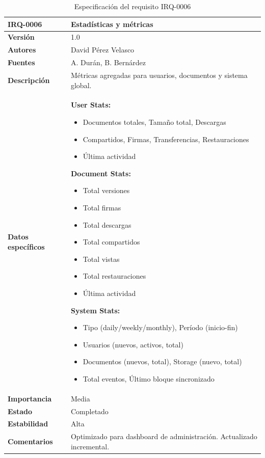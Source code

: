 \documentclass[11pt, a4paper]{article}
\begin{document}
\begin{table}[H]
    \centering
    \small
    \begin{tabular}{|p{4cm}|p{10cm}|}
    \hline
    \textbf{IRQ-0006} & Estadísticas y métricas \\
    \hline
    \textbf{Versión} & 1.0 \\
    \hline
    \textbf{Autores} & David Pérez Velasco \\
    \hline
    \textbf{Fuentes} & A. Durán, B. Bernárdez \\
    \hline
    \textbf{Descripción} & Métricas agregadas para usuarios, documentos y sistema global. \\
    \hline
    \textbf{Datos específicos} & 
    \textbf{User Stats:}
    \begin{itemize}
        \item Documentos totales, Tamaño total, Descargas
        \item Compartidos, Firmas, Transferencias, Restauraciones
        \item Última actividad
    \end{itemize}
    
    \textbf{Document Stats:}
    \begin{itemize}
        \item Total versiones
        \item Total firmas
        \item Total descargas
        \item Total compartidos
        \item Total vistas
        \item Total restauraciones
        \item Última actividad
    \end{itemize}
    
    \textbf{System Stats:}
    \begin{itemize}
        \item Tipo (daily/weekly/monthly), Período (inicio-fin)
        \item Usuarios (nuevos, activos, total)
        \item Documentos (nuevos, total), Storage (nuevo, total)
        \item Total eventos, Último bloque sincronizado
    \end{itemize} \\
    \hline
    \textbf{Importancia} & Media \\
    \hline
    \textbf{Estado} & Completado \\
    \hline
    \textbf{Estabilidad} & Alta \\
    \hline
    \textbf{Comentarios} & Optimizado para dashboard de administración. Actualizado incremental. \\
    \hline
    \end{tabular}
    \caption{Especificación del requisito IRQ-0006}
\end{table}
\end{document}
